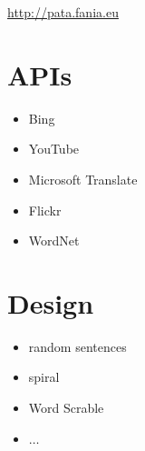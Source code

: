 \url{http://pata.fania.eu}


\section{APIs}

\begin{itemize}
  \item Bing
  \item YouTube
  \item Microsoft Translate
  \item Flickr
  \item WordNet
\end{itemize}


\section{Design}

\begin{itemize}
  \item random sentences
  \item spiral
  \item Word Scrable
  \item $\dots$
\end{itemize}
